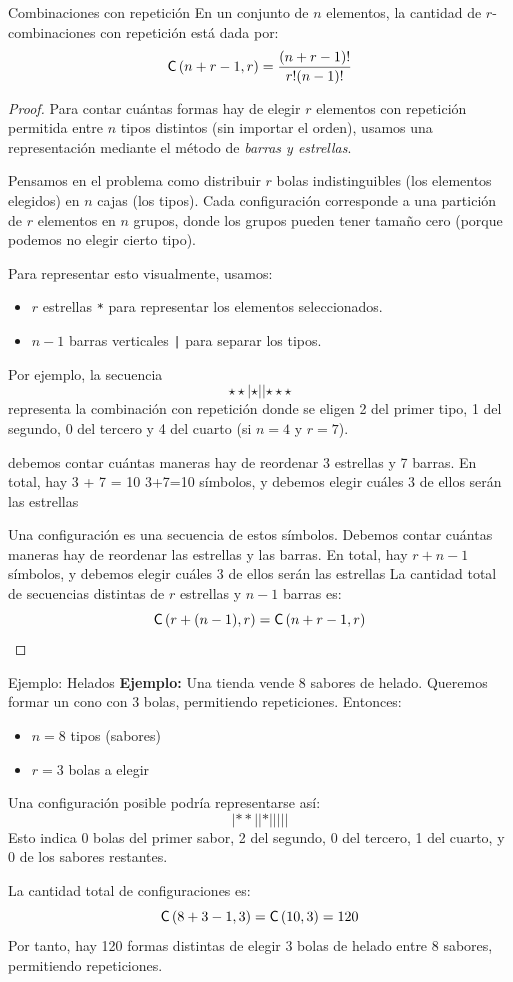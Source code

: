 \begin{definitionblock}{Combinaciones con repetición}
En un conjunto de $n$ elementos, la cantidad de $r$-combinaciones con repetición está dada por:
\[
\mathsf{C}\left(n + r - 1,r\right) = \frac{(n + r - 1)!}{r!(n - 1)!}
\]
\end{definitionblock}
\begin{proof}
Para contar cuántas formas hay de elegir $r$ elementos con repetición permitida entre $n$ tipos distintos (sin importar el orden), usamos una representación mediante el método de \emph{barras y estrellas}.

Pensamos en el problema como distribuir $r$ bolas indistinguibles (los elementos elegidos) en $n$ cajas (los tipos). Cada configuración corresponde a una partición de $r$ elementos en $n$ grupos, donde los grupos pueden tener tamaño cero (porque podemos no elegir cierto tipo).

Para representar esto visualmente, usamos:
\begin{itemize}
  \item $r$ estrellas \texttt{*} para representar los elementos seleccionados.
  \item $n-1$ barras verticales \texttt{|} para separar los tipos.
\end{itemize}

Por ejemplo, la secuencia 
\[\star \star | \star | | \star \star \star\]
representa la combinación con repetición donde se eligen 2 del primer tipo, 1 del segundo, 0 del tercero y 4 del cuarto (si $n=4$ y $r=7$).

 debemos contar cuántas maneras hay de reordenar 3 estrellas y 7 barras. En total, hay 
3
+
7
=
10
3+7=10 símbolos, y debemos elegir cuáles 3 de ellos serán las estrellas

Una configuración es una secuencia de estos símbolos. Debemos contar cuántas maneras hay de reordenar las estrellas y las barras. En total, hay $r + n-1$ símbolos, y debemos elegir cuáles $3$ de ellos serán las estrellas   La cantidad total de secuencias distintas de $r$ estrellas y $n-1$ barras es:
\[
\mathsf{C}\left(r + (n - 1),r\right) = \mathsf{C}\left(n + r - 1,r\right)
\]
\end{proof}



\begin{exampleblock}{Ejemplo: Helados}
\textbf{Ejemplo:} Una tienda vende 8 sabores de helado. Queremos formar un cono con 3 bolas, permitiendo repeticiones. Entonces:
\begin{itemize}
  \item $n = 8$ tipos (sabores)
  \item $r = 3$ bolas a elegir
\end{itemize}

Una configuración posible podría representarse así:
\[
| * * | | * | | | | |
\]
Esto indica 0 bolas del primer sabor, 2 del segundo, 0 del tercero, 1 del cuarto, y 0 de los sabores restantes.

La cantidad total de configuraciones es:
\[
\mathsf{C}\left(8 + 3 - 1,3\right) = \mathsf{C}\left(10,3\right) = 120
\]
Por tanto, hay 120 formas distintas de elegir 3 bolas de helado entre 8 sabores, permitiendo repeticiones.
\end{exampleblock}


